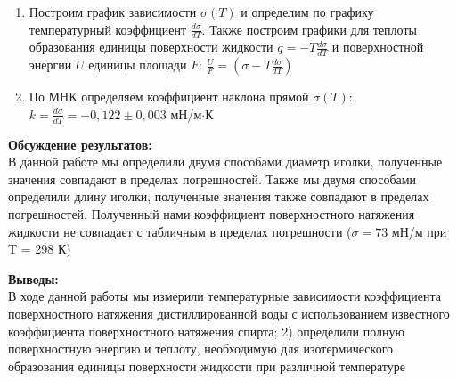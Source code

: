 \documentclass[a4paper, 12pt]{article}%
\begin{document}
\begin{enumerate}
\item Построим график зависимости $\sigma (T)$ и определим по графику температурный
коэффициент $\frac{d\sigma}{dT}$. Также построим графики для теплоты образования единицы поверхности жидкости $q = -T\frac{d\sigma}{dT}$ и поверхностной энергии $U$ единицы площади $F$: $\frac{U}{F} = (\sigma  -T\frac{d\sigma}{dT} )$

\newpage

	\begin{figure}[h]
\end{figure}

\item По МНК определяем коэффициент наклона прямой $\sigma (T)$: $k = \frac{d\sigma}{dT} = -0,122 \pm 0,003$ мН/м$\cdot$К
	\end{enumerate}

	\textbf{Обсуждение результатов: }\\
В данной работе мы определили двумя способами диаметр иголки, полученные значения совпадают в пределах погрешностей. Также мы двумя способами определили длину иголки, полученные значения также совпадают в пределах погрешностей. Полученный нами коэффициент поверхностного натяжения жидкости не совпадает с табличным в пределах погрешности ($\sigma = 73$ мН/м при T = 298 К)



	\textbf{Выводы: }\\ В ходе данной работы мы
измерили температурные зависимости коэффициента поверхностного
натяжения дистиллированной воды с использованием известного коэффициента
поверхностного натяжения спирта; 2) определили полную поверхностную энергию и
теплоту, необходимую для изотермического образования единицы поверхности жидкости
при различной температуре

	
\end{document}
